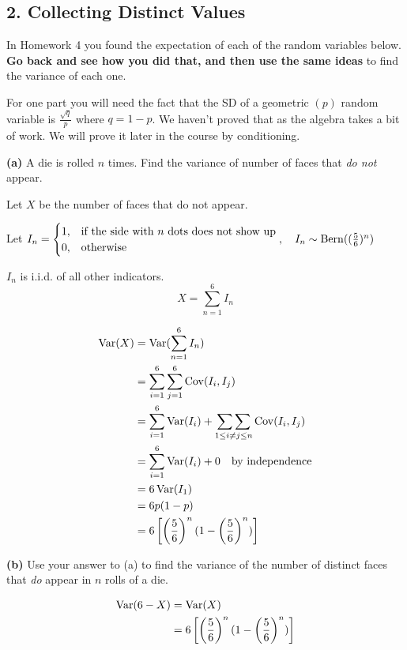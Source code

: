 \documentclass[11pt]{article}
\begin{document}
    \newpage

    \subsection*{2. Collecting Distinct
Values}\label{collecting-distinct-values}

In Homework 4 you found the expectation of each of the random variables
below. \textbf{Go back and see how you did that, and then use the same
ideas} to find the variance of each one.

For one part you will need the fact that the SD of a geometric \((p)\)
random variable is \(\frac{\sqrt{q}}{p}\) where \(q = 1-p\). We haven't
proved that as the algebra takes a bit of work. We will prove it later
in the course by conditioning.

\textbf{(a)} A die is rolled \(n\) times. Find the variance of number of
faces that \emph{do not} appear.

Let $ X $ be the number of faces that do not appear.

Let $ I_{n} = \begin{cases}
	1, &\text{if the side with $ n $ dots does not show up}\\
	0, &\text{otherwise}
\end{cases}, \quad I_{n} \sim \operatorname{Bern}((\frac{5}{6})^{n}) $

$ I_{n} $ is i.i.d. of all other indicators. 
\[
X = \sum_{n=1}^{6}I_{n}
\]

\begin{align*}
	\operatorname{Var}(X) &= \operatorname{Var}(\sum_{n=1}^{6}I_{n}) \\
&= \sum_{i=1}^{6}\sum_{j=1}^{6}\operatorname{Cov}(I_{i}, I_{j}) \\
&= \sum_{i=1}^{6} \operatorname{Var}(I_{i}) + \mathop{\sum\sum}_{1\le i\neq j \le n} \operatorname{Cov}(I_{i}, I_{j})\\
&= \sum_{i=1}^{6}\operatorname{Var}(I_{i}) + 0 \quad \text{by independence} \\
&= 6\operatorname{Var}(I_{1}) \\
&= 6p(1-p) \\
&= 6 \left[  \left( \frac{5}{6} \right)^{n} (1- \left( \frac{5}{6} \right)^{n})\right]  \\
\end{align*}




\textbf{(b)} Use your answer to (a) to find the variance of the number
of distinct faces that \emph{do} appear in \(n\) rolls of a die.

\begin{align*}
	\operatorname{Var}(6-X) &= \operatorname{Var}(X) \\
&= 6 \left[  \left( \frac{5}{6} \right)^{n} (1- \left( \frac{5}{6} \right)^{n})\right]  \\
\end{align*}
\end{document}
